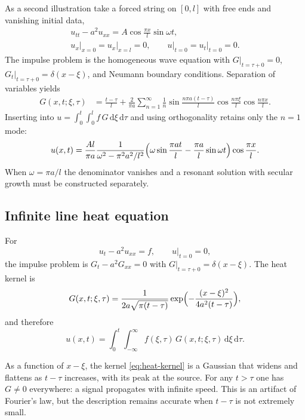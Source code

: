 As a second illustration take a forced string on $[0,l]$ with free ends and vanishing initial data,
\begin{equation}
\begin{gathered}
u_{tt}-a^2 u_{xx}=A\cos\frac{\pi x}{l}\sin\omega t,\\
u_x\big|_{x=0}=u_x\big|_{x=l}=0,
\qquad
u\big|_{t=0}=u_t\big|_{t=0}=0.
\end{gathered}
\end{equation}
The impulse problem is the homogeneous wave equation with $G|_{t=\tau+0}=0$, $G_t|_{t=\tau+0}=\delta(x-\xi)$, and Neumann boundary conditions. Separation of variables yields
\begin{equation}
\begin{aligned}
G(x,t;\xi,\tau)
&=\frac{t-\tau}{l}
+\frac{2}{\pi a}\sum_{n=1}^{\infty}\frac{1}{n}
\sin\frac{n\pi a(t-\tau)}{l}
\cos\frac{n\pi\xi}{l}\cos\frac{n\pi x}{l}.
\end{aligned}
\end{equation}
Inserting into $u=\int_0^t\int_0^l f\,G\,\mathrm{d}\xi\,\mathrm{d}\tau$ and using orthogonality retains only the $n=1$ mode:
\begin{equation}
u(x,t)
=\frac{Al}{\pi a}\frac{1}{\omega^2-\pi^2 a^2/l^2}
\Bigl(\omega\sin\frac{\pi a t}{l}-\frac{\pi a}{l}\sin\omega t\Bigr)
\cos\frac{\pi x}{l}.
\end{equation}
When $\omega=\pi a/l$ the denominator vanishes and a resonant solution with secular growth must be constructed separately.

\subsection{Infinite line heat equation}

For
\begin{equation}
u_t-a^2 u_{xx}=f,
\qquad
u\big|_{t=0}=0,
\end{equation}
the impulse problem is $G_t-a^2 G_{xx}=0$ with $G|_{t=\tau+0}=\delta(x-\xi)$. The heat kernel is
\begin{equation}
\label{eq:heat-kernel}
G(x,t;\xi,\tau)
=\frac{1}{2a\sqrt{\pi(t-\tau)}}
\exp\Bigl(-\frac{(x-\xi)^2}{4a^2(t-\tau)}\Bigr),
\end{equation}
and therefore
\begin{equation}
u(x,t)
=\int_0^{t}\int_{-\infty}^{\infty}
f(\xi,\tau)\,G(x,t;\xi,\tau)\,\mathrm{d}\xi\,\mathrm{d}\tau.
\end{equation}

\begin{note}
As a function of $x-\xi$, the kernel \eqref{eq:heat-kernel} is a Gaussian that widens and flattens as $t-\tau$ increases, with its peak at the source. For any $t>\tau$ one has $G\neq0$ everywhere: a signal propagates with infinite speed. This is an artifact of Fourier's law, but the description remains accurate when $t-\tau$ is not extremely small.
\end{note}

